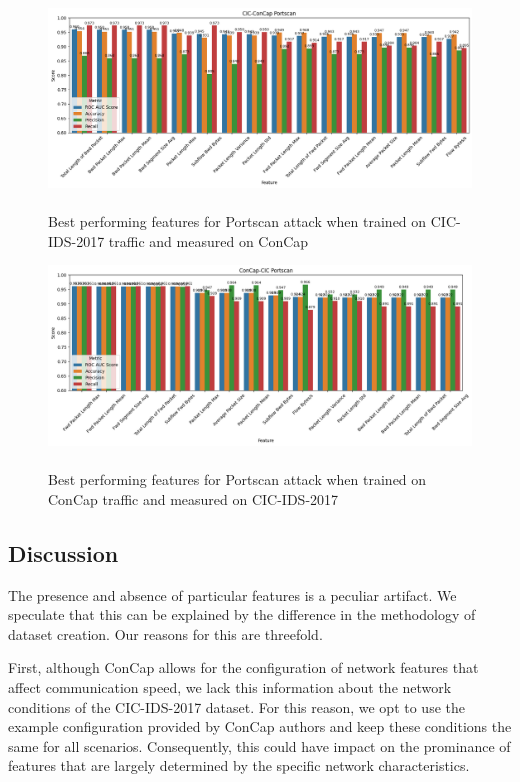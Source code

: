 \begin{figure}
	\centering
	\includegraphics[width=1.2\linewidth]{images/portscan_cic_concap}
	\caption{\\Best performing features for Portscan attack when trained on CIC-IDS-2017 traffic and measured on ConCap}
	\label{fig:portscan_cic_concap}
\end{figure}
\begin{figure}
	\centering
	\includegraphics[width=1.2\linewidth]{images/portscan_concap_cic}
	\caption{\\Best performing features for Portscan attack when trained on ConCap traffic and measured on CIC-IDS-2017}
	\label{fig:portscan_concap_cic}
\end{figure}



\newpage
\subsection{Discussion}
The presence and absence of particular features is a peculiar artifact. We speculate that this can be explained by the difference in the methodology of dataset creation. Our reasons for this are threefold. 

First, although ConCap allows for the configuration of network features that affect communication speed, we lack this information about the network conditions of the CIC-IDS-2017 dataset. For this reason, we opt to use the example configuration provided by ConCap authors and keep these conditions the same for all scenarios. Consequently, this could have impact on the prominance of features that are largely determined by the specific network characteristics.


